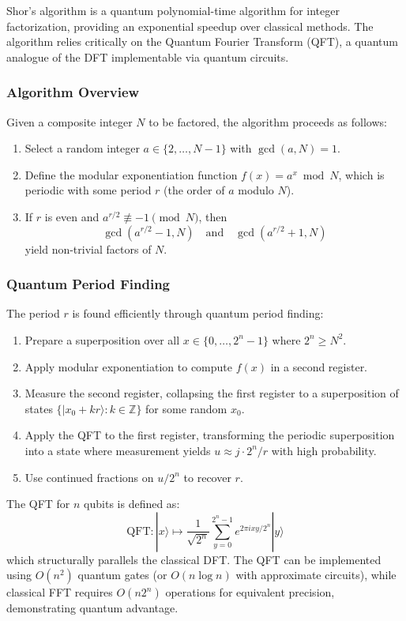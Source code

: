 \documentclass[a4paper]{article}
\theoremstyle{definition}
\begin{document}
Shor's algorithm is a quantum polynomial-time algorithm for integer factorization, providing an exponential speedup over classical methods. The algorithm relies critically on the Quantum Fourier Transform (QFT), a quantum analogue of the DFT implementable via quantum circuits.

\subsubsection{Algorithm Overview}

Given a composite integer $N$ to be factored, the algorithm proceeds as follows:
\begin{enumerate}
    \item Select a random integer $a \in \{2, \ldots, N-1\}$ with $\gcd(a, N) = 1$.
    \item Define the modular exponentiation function $f(x) = a^x \bmod N$, which is periodic with some period $r$ (the order of $a$ modulo $N$).
    \item If $r$ is even and $a^{r/2} \not\equiv -1 \pmod{N}$, then
    \[
    \gcd(a^{r/2} - 1, N) \quad \text{and} \quad \gcd(a^{r/2} + 1, N)
    \]
    yield non-trivial factors of $N$.
\end{enumerate}

\subsubsection{Quantum Period Finding}

The period $r$ is found efficiently through quantum period finding:
\begin{enumerate}
    \item Prepare a superposition over all $x \in \{0, \ldots, 2^n-1\}$ where $2^n \geq N^2$.
    \item Apply modular exponentiation to compute $f(x)$ in a second register.
    \item Measure the second register, collapsing the first register to a superposition of states $\{|x_0 + kr\rangle : k \in \mathbb{Z}\}$ for some random $x_0$.
    \item Apply the QFT to the first register, transforming the periodic superposition into a state where measurement yields $u \approx j \cdot 2^n/r$ with high probability.
    \item Use continued fractions on $u/2^n$ to recover $r$.
\end{enumerate}

The QFT for $n$ qubits is defined as:
\[
\text{QFT}: |x\rangle \mapsto \frac{1}{\sqrt{2^n}} \sum_{y=0}^{2^n-1} e^{2\pi i xy / 2^n} |y\rangle
\]
which structurally parallels the classical DFT. The QFT can be implemented using $O(n^2)$ quantum gates (or $O(n \log n)$ with approximate circuits), while classical FFT requires $O(n 2^n)$ operations for equivalent precision, demonstrating quantum advantage.
\end{document}
